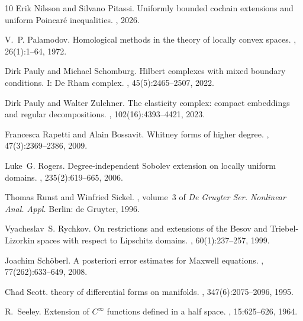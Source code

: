 \documentclass[10pt,a4paper]{amsart}
\theoremstyle{definition}
\theoremstyle{remark}
\numberwithin{equation}{section}
\begin{document}
\begin{thebibliography}{10}
Erik Nilsson and Silvano Pitassi.
\newblock Uniformly bounded cochain extensions and uniform {Poincar\'e}
  inequalities.
, 2026.

V.~P. Palamodov.
\newblock Homological methods in the theory of locally convex spaces.
, 26(1):1--64, 1972.

Dirk Pauly and Michael Schomburg.
\newblock Hilbert complexes with mixed boundary conditions. {I}: {De} {Rham}
  complex.
, 45(5):2465--2507, 2022.

Dirk Pauly and Walter Zulehner.
\newblock The elasticity complex: compact embeddings and regular
  decompositions.
, 102(16):4393--4421, 2023.

Francesca Rapetti and Alain Bossavit.
\newblock Whitney forms of higher degree.
, 47(3):2369--2386, 2009.

Luke~G. Rogers.
\newblock Degree-independent {Sobolev} extension on locally uniform domains.
, 235(2):619--665, 2006.

Thomas Runst and Winfried Sickel.
, volume~3 of {\em De Gruyter Ser.
  Nonlinear Anal. Appl.}
\newblock Berlin: de Gruyter, 1996.

Vyacheslav~S. Rychkov.
\newblock On restrictions and extensions of the {Besov} and
  {Triebel}-{Lizorkin} spaces with respect to {Lipschitz} domains.
, 60(1):237--257, 1999.

Joachim Sch{\"o}berl.
\newblock A posteriori error estimates for {Maxwell} equations.
, 77(262):633--649, 2008.

Chad Scott.
 theory of differential forms on manifolds.
,
  347(6):2075--2096, 1995.

R.~Seeley.
\newblock Extension of {{\(C^ \infty\)}} functions defined in a half space.
, 15:625--626, 1964.


\end{thebibliography}
\end{document}

